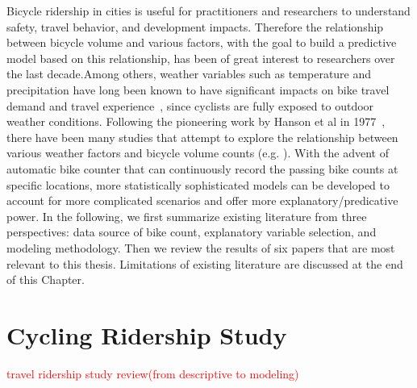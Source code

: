 \documentclass [11pt, proquest] {uwthesis}[2015/03/03]
\begin{document}
Bicycle ridership in cities is useful for practitioners and researchers to understand safety, travel behavior, and development impacts. Therefore the relationship between bicycle volume and various factors, with the goal to build a predictive model based on this relationship, has been of great interest to researchers over the last decade.Among others, weather variables such as temperature and precipitation have long been known to have significant impacts on bike travel demand and travel experience~\cite{Guo07}, since cyclists are fully exposed to outdoor weather conditions. Following the pioneering work by Hanson et al in 1977~\cite{Hanson77}, there have been many studies that attempt to explore the relationship between various weather factors and bicycle volume counts (e.g. \cite{Griswold:2011aa,Fields:2012aa,Niemeier:1996aa,Nosal:2014aa, PeterWeiran16}). With the advent of automatic bike counter that can continuously record the passing bike counts at specific locations, more statistically sophisticated models can be developed to account for more complicated scenarios and offer more explanatory/predicative power. In the following, we first summarize existing literature from three perspectives: data source of bike count, explanatory variable selection, and modeling methodology. Then we review the results of six papers that are most relevant to this thesis. Limitations of existing literature are discussed at the end of this Chapter.



\section{Cycling Ridership Study}

\textcolor{red}{travel ridership study review(from descriptive to modeling)}
\end{document}

